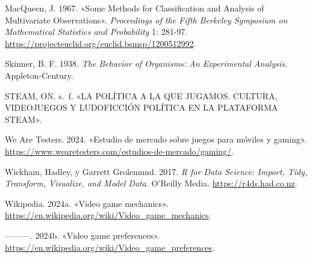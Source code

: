 \documentclass[
  letterpaper,
  DIV=11,
  numbers=noendperiod]{scrreprt}
\newlength{\cslhangindent}
\newenvironment{CSLReferences}[2] %
 {\begin{list}{}{%
  \setlength{\itemindent}{0pt}
  \setlength{\leftmargin}{0pt}
  \setlength{\parsep}{0pt}
  \ifodd #1
   \setlength{\leftmargin}{\cslhangindent}
   \setlength{\itemindent}{-1\cslhangindent}
  \fi
  \setlength{\itemsep}{#2\baselineskip}}}
 {\end{list}}
\begin{document}
\begin{CSLReferences}{1}{0}
MacQueen, J. 1967. {«Some Methods for Classification and Analysis of
Multivariate Observations»}. \emph{Proceedings of the Fifth Berkeley
Symposium on Mathematical Statistics and Probability} 1: 281-97.
\url{https://projecteuclid.org/euclid.bsmsp/1200512992}.

Skinner, B. F. 1938. \emph{The Behavior of Organisms: An Experimental
Analysis}. Appleton-Century.

STEAM, ON. s.~f. {«LA POLÍTICA A LA QUE JUGAMOS. CULTURA, VIDEOJUEGOS Y
LUDOFICCIÓN POLÍTICA EN LA PLATAFORMA STEAM»}.

We Are Testers. 2024. {«Estudio de mercado sobre juegos para móviles y
gaming»}.
\url{https://www.wearetesters.com/estudios-de-mercado/gaming/}.

Wickham, Hadley, y Garrett Grolemund. 2017. \emph{R for Data Science:
Import, Tidy, Transform, Visualize, and Model Data}. O'Reilly Media.
\url{https://r4ds.had.co.nz}.

Wikipedia. 2024a. {«Video game mechanics»}.
\url{https://en.wikipedia.org/wiki/Video_game_mechanics}.

---------. 2024b. {«Video game preferences»}.
\url{https://en.wikipedia.org/wiki/Video_game_preferences}.

\end{CSLReferences}
\end{document}

